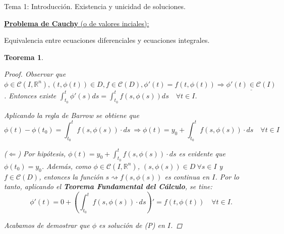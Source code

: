 \documentclass{article}
\newtheorem{theorem}{Teorema}[section]
\begin{document}
\begin{section}{Tema 1: Introducción. Existencia y unicidad de soluciones.}
\begin{subsection}{\underline{\textbf{Problema de Cauchy} (o de valores inciales):}}
\begin{subsection}{Equivalencia entre ecuaciones diferenciales y ecuaciones integrales.}
\begin{theorem}
\begin{proof}
                Observar que $\phi\in\mathcal{C}(I,\mathbb{R}^n), (t, \phi(t))\in D, f\in \mathcal{C}(D), \phi'(t) = f(t,\phi(t))\Rightarrow\underline{\phi'(t)\in\mathcal{C}(I)}$.
                Entonces existe $\int_{t_0}^{t}\phi'(s)ds=\int_{t_0}^{t}f(s, \phi(s))ds\quad \forall t\in I$.

                Aplicando la regla de Barrow se obtiene que
                \[\phi(t) - \phi(t_0) = \int_{t_0}^{t}f(s,\phi(s))\cdot ds\ \Longrightarrow \phi(t) = y_0 + \int_{t_0}^{t}f(s, \phi(s))\cdot ds \quad \forall t\in I\]

                ($\mathbf{\Longleftarrow}$) Por hipótesis, $\phi(t) = y_0 + \int_{t_0}^{t}f(s, \phi(s))\cdot ds$ es evidente que $\phi(t_0) = y_0$.
                Además, como $\phi \in\mathcal{C}(I, \mathbb{R}^n)$, $(s, \phi(s))\in D \ \forall s \in I$ y $f\in \mathcal{C}(D)$, entonces la función $s \rightsquigarrow f(s, \phi(s))$ es continua en $I$.
                Por lo tanto, aplicando el \textbf{Teorema Fundamental del Cálculo}, se tine:
                \[\phi'(t) = 0+(\int_{t_0}^{t}f(s, \phi(s))\cdot ds)' = f(t, \phi(t))\quad \forall t\in I.\]

                Acabamos de demostrar que $\phi$ es solución de (P) en $I$.
            \end{proof}
            \end{theorem}
        \end{subsection}
    \end{subsection}

\end{section}
\end{document}
